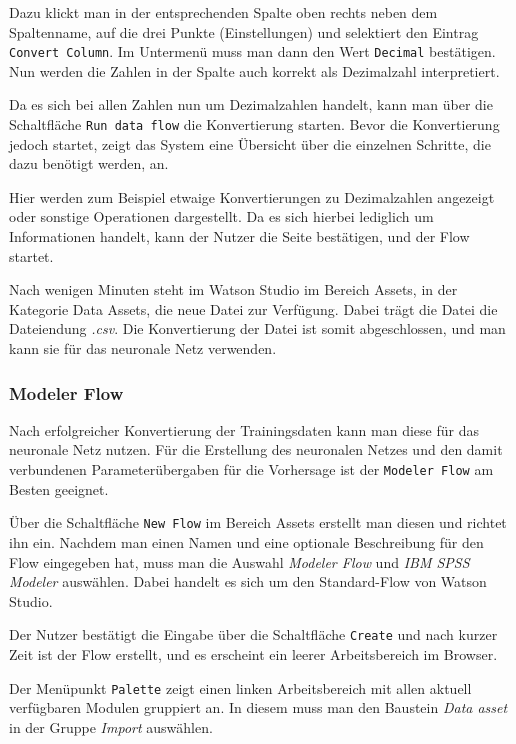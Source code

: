 Dazu klickt man in der entsprechenden Spalte oben rechts neben dem Spaltenname, auf die drei Punkte (Einstellungen) und
selektiert den Eintrag \texttt{Convert Column}. Im Untermenü muss man dann den Wert \texttt{Decimal} bestätigen. Nun
werden die Zahlen in der Spalte auch korrekt als Dezimalzahl interpretiert.

Da es sich bei allen Zahlen nun um Dezimalzahlen handelt, kann man über die Schaltfläche \texttt{Run data flow} die
Konvertierung starten. Bevor die Konvertierung jedoch startet, zeigt das System eine Übersicht über die einzelnen
Schritte, die dazu benötigt werden, an.

Hier werden zum Beispiel etwaige Konvertierungen zu Dezimalzahlen angezeigt oder sonstige Operationen dargestellt. Da
es sich hierbei lediglich um Informationen handelt, kann der Nutzer die Seite bestätigen, und der Flow startet.

Nach wenigen Minuten steht im Watson Studio im Bereich Assets, in der Kategorie Data Assets, die neue Datei zur
Verfügung. Dabei trägt die Datei die Dateiendung \textit{.csv}. Die Konvertierung der Datei ist somit abgeschlossen, und
man kann sie für das neuronale Netz verwenden.

\subsubsection{Modeler Flow}
\label{subsub:modeler_flow}
Nach erfolgreicher Konvertierung der Trainingsdaten kann man diese für das neuronale Netz nutzen. Für die Erstellung
des neuronalen Netzes und den damit verbundenen Parameterübergaben für die Vorhersage ist der \texttt{Modeler Flow} am
Besten geeignet.

Über die Schaltfläche \texttt{New Flow} im Bereich Assets erstellt man diesen und richtet ihn ein. Nachdem man einen
Namen und eine optionale Beschreibung für den Flow eingegeben hat, muss man die Auswahl \textit{Modeler Flow} und
\textit{IBM SPSS Modeler} auswählen. Dabei handelt es sich um den Standard-Flow von Watson Studio.

Der Nutzer bestätigt die Eingabe über die Schaltfläche \texttt{Create} und nach kurzer Zeit ist der Flow erstellt, und
es erscheint ein leerer Arbeitsbereich im Browser.

Der Menüpunkt \texttt{Palette} zeigt einen linken Arbeitsbereich mit allen aktuell verfügbaren Modulen gruppiert an. In
diesem muss man den Baustein \textit{Data asset} in der Gruppe \textit{Import} auswählen.

